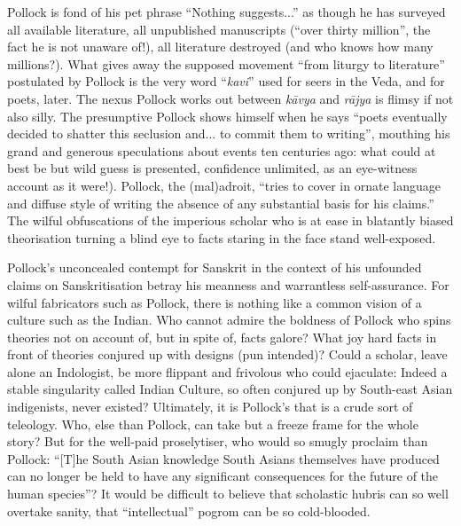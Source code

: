Pollock is fond of his pet phrase “Nothing suggests...” as though he has surveyed all available literature, all unpublished manuscripts (“over thirty million”, the fact he is not unaware of!), all literature destroyed (and who knows how many millions?). What gives away the supposed movement “from liturgy to literature” postulated by Pollock is the very word “\textit{kavi}” used for seers in the Veda, and for poets, later. The nexus Pollock works out between \textit{kāvya} and \textit{rājya} is flimsy if not also silly. The presumptive Pollock shows himself when he says “poets eventually decided to shatter this seclusion and... to commit them to writing”, mouthing his grand and generous speculations about events ten centuries ago: what could at best be but wild guess is presented, confidence unlimited, as an eye-witness account as it were!). Pollock, the (mal)adroit, “tries to cover in ornate language and diffuse style of writing the absence of any substantial basis for his claims.” The wilful obfuscations of the imperious scholar who is at ease in blatantly biased theorisation turning a blind eye to facts staring in the face stand well-exposed.

Pollock’s unconcealed contempt for Sanskrit in the context of his unfounded claims on Sanskritisation betray his meanness and warrantless self-assurance. For wilful fabricators such as Pollock, there is nothing like a common vision of a culture such as the Indian. Who cannot admire the boldness of Pollock who spins theories not on account of, but in spite of, facts galore? What joy hard facts in front of theories conjured up with designs (pun intended)? Could a scholar, leave alone an Indologist, be more flippant and frivolous who could ejaculate: Indeed a stable singularity called Indian Culture, so often conjured up by South-east Asian indigenists, never existed? Ultimately, it is Pollock’s that is a crude sort of teleology. Who, else than Pollock, can take but a freeze frame for the whole story? But for the well-paid proselytiser, who would so smugly proclaim than Pollock: “[T]he South Asian knowledge South Asians themselves have produced can no longer be held to have any significant consequences for the future of the human species”? It would be difficult to believe that scholastic hubris can so well overtake sanity, that “intellectual” pogrom can be so cold-blooded.

